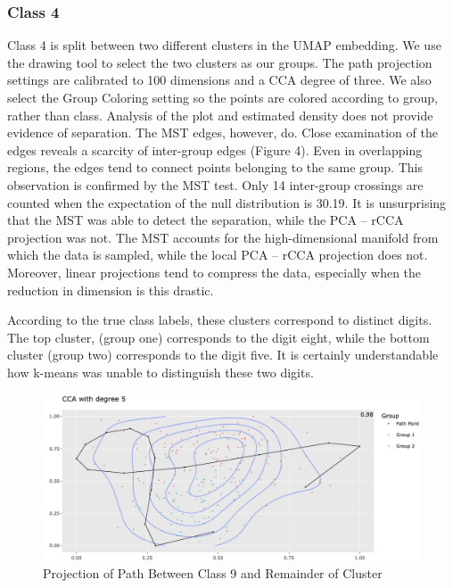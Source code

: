 \documentclass{article}
\begin{document}
\subsubsection{Class 4}
Class 4 is split between two different clusters in the UMAP embedding. We use the drawing tool to select the two clusters as our groups. The path projection settings are calibrated to 100 dimensions and a CCA degree of three. We also select the Group Coloring setting so the points are colored according to group, rather than class. Analysis of the plot and estimated density does not provide evidence of separation. The MST edges, however, do. Close examination of the edges reveals a scarcity of inter-group edges (Figure 4). Even in overlapping regions, the edges tend to connect points belonging to the same group. This observation is confirmed by the MST test. Only 14 inter-group crossings are counted when the expectation of the null distribution is 30.19. It is unsurprising that the MST was able to detect the separation, while the PCA -- rCCA projection was not. The MST accounts for the high-dimensional manifold from which the data is sampled, while the local PCA -- rCCA projection does not. Moreover, linear projections tend to compress the data, especially when the reduction in dimension is this drastic.

According to the true class labels, these clusters correspond to distinct digits. The top cluster, (group one) corresponds to the digit eight, while the bottom cluster (group two) corresponds to the digit five. It is certainly understandable how k-means was unable to distinguish these two digits.

\renewcommand{\figurename}{Figure}
\renewcommand{\thefigure}{5}
\begin{figure}[!t]
\centering
\includegraphics[scale=0.37]{class 9 projection}
\caption{Projection of Path Between Class 9 and Remainder of Cluster}
\end{figure}
\end{document}
